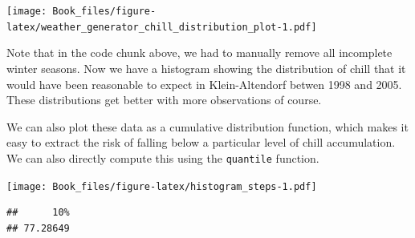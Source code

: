 \documentclass[
]{book}
\newenvironment{Shaded}{\begin{snugshade}}{\end{snugshade}}
\newcommand{\CommentTok}[1]{\textcolor[rgb]{0.56,0.35,0.01}{\textit{#1}}}
\newcommand{\DataTypeTok}[1]{\textcolor[rgb]{0.13,0.29,0.53}{#1}}
\newcommand{\DecValTok}[1]{\textcolor[rgb]{0.00,0.00,0.81}{#1}}
\newcommand{\FloatTok}[1]{\textcolor[rgb]{0.00,0.00,0.81}{#1}}
\newcommand{\KeywordTok}[1]{\textcolor[rgb]{0.13,0.29,0.53}{\textbf{#1}}}
\newcommand{\NormalTok}[1]{#1}
\newcommand{\OperatorTok}[1]{\textcolor[rgb]{0.81,0.36,0.00}{\textbf{#1}}}
\newcommand{\StringTok}[1]{\textcolor[rgb]{0.31,0.60,0.02}{#1}}
\begin{document}
\texttt{[image: Book\_files/figure-latex/weather\_generator\_chill\_distribution\_plot-1.pdf]}

Note that in the code chunk above, we had to manually remove all incomplete winter seasons. Now we have a histogram showing the distribution of chill that it would have been reasonable to expect in Klein-Altendorf betwen 1998 and 2005. These distributions get better with more observations of course.

We can also plot these data as a cumulative distribution function, which makes it easy to extract the risk of falling below a particular level of chill accumulation. We can also directly compute this using the \texttt{quantile} function.

\begin{Shaded}
\end{Shaded}

\texttt{[image: Book\_files/figure-latex/histogram\_steps-1.pdf]}

\begin{Shaded}
\end{Shaded}

\begin{verbatim}
##      10% 
## 77.28649
\end{verbatim}
\end{document}
